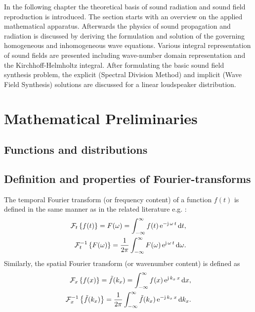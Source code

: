 In the following chapter the theoretical basis of sound radiation and sound field reproduction is introduced. The section starts with an overview on the applied mathematical apparatus.
Afterwards the physics of sound propagation and radiation is discussed by deriving the formulation and solution of the governing homogeneous and inhomogeneous wave equations. Various integral representation of sound fields are presented including wave-number domain representation and the Kirchhoff-Helmholtz integral. After formulating the basic sound field synthesis problem, the explicit (Spectral Division Method) and implicit (Wave Field Synthesis) solutions are discussed for a linear loudspeaker distribution.
%
\section{Mathematical Preliminaries}
%
\subsection{Functions and distributions}
\subsection{Definition and properties of Fourier-transforms}

The temporal Fourier transform (or frequency content) of a function $f(t)$ is defined in the same manner as in the related literature e.g. \cite{Ahrens2012, Ahrens2010a}:
%
\begin{align}
\mathcal{F}_{t} \left\{  f(t) \right\}  = F(\omega) = \int_{-\infty}^{\infty} f(t) \, \mathrm{e}^{-\mathrm{j} \,\omega \, t} \, \mathrm{d} t, \\
\mathcal{F}^{-1}_{t} \left\{  F(\omega) \right\}  = \frac{1}{2\pi} \int_{-\infty}^{\infty} F(\omega)\, \mathrm{e}^{\mathrm{j}\, \omega\, t} \, \mathrm{d} \omega.
\label{Eq:Math:Temp_Fourier}
\end{align}
%
Similarly, the spatial Fourier transform (or wavenumber content) is defined as
%
\begin{align}
\mathcal{F}_{x} \left\{  f(x) \right\}  = \tilde{f}(k_x) = \int_{-\infty}^{\infty} f(x)\, \mathrm{e}^{\mathrm{j}\, k_x\, x}\, \mathrm{d} x, \\
\mathcal{F}^{-1}_{x} \left\{  \tilde{f}(k_x) \right\}  = \frac{1}{2\pi} \int_{-\infty}^{\infty} \tilde{f}(k_x)\, \mathrm{e}^{-\mathrm{j}\, k_x\, x}\, \mathrm{d} k_x.
\end{align}

